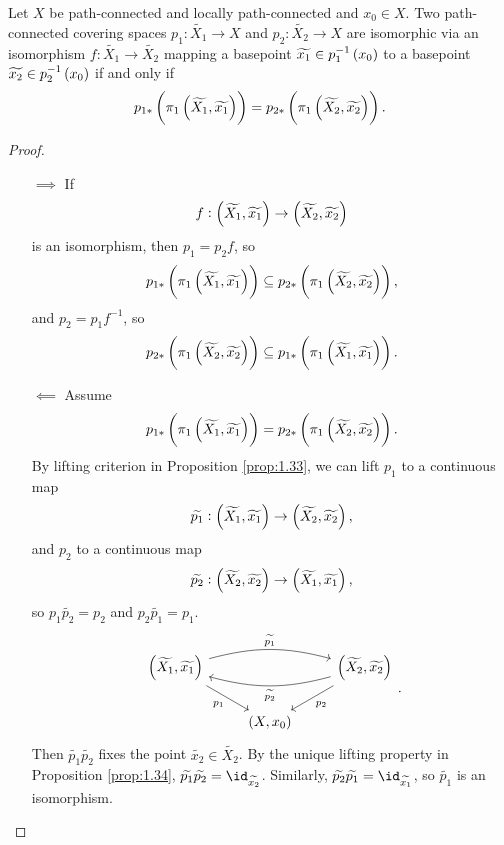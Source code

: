 \begin{proposition}
\label{prop:1.37}
Let $ X $ be path-connected and locally path-connected and $ x_0 \in X $. Two path-connected covering spaces $ p_1 : \widetilde{X_1} \to X $ and $ p_2 : \widetilde{X_2} \to X $ are isomorphic via an isomorphism $ f : \widetilde{X_1} \to \widetilde{X_2} $ mapping a basepoint $ \widetilde{x_1} \in p_1^{-1}\br{x_0} $ to a basepoint $ \widetilde{x_2} \in p_2^{-1}\br{x_0} $ if and only if
$$ p_{1*}\br{\pi_1\br{\widetilde{X_1}, \widetilde{x_1}}} = p_{2*}\br{\pi_1\br{\widetilde{X_2}, \widetilde{x_2}}}. $$
\end{proposition}

\begin{proof}
\hfill
\begin{itemize}
\item[$ \implies $] If
$$ f : \br{\widetilde{X_1}, \widetilde{x_1}} \to \br{\widetilde{X_2}, \widetilde{x_2}} $$
is an isomorphism, then $ p_1 = p_2f $, so
$$ p_{1*}\br{\pi_1\br{\widetilde{X_1}, \widetilde{x_1}}} \subseteq p_{2*}\br{\pi_1\br{\widetilde{X_2}, \widetilde{x_2}}}, $$
and $ p_2 = p_1f^{-1} $, so
$$ p_{2*}\br{\pi_1\br{\widetilde{X_2}, \widetilde{x_2}}} \subseteq p_{1*}\br{\pi_1\br{\widetilde{X_1}, \widetilde{x_1}}}. $$

\pagebreak

\item[$ \impliedby $] Assume
$$ p_{1*}\br{\pi_1\br{\widetilde{X_1}, \widetilde{x_1}}} = p_{2*}\br{\pi_1\br{\widetilde{X_2}, \widetilde{x_2}}}. $$
By lifting criterion in Proposition \ref{prop:1.33}, we can lift $ p_1 $ to a continuous map
$$ \widetilde{p_1} : \br{\widetilde{X_1}, \widetilde{x_1}} \to \br{\widetilde{X_2}, \widetilde{x_2}}, $$
and $ p_2 $ to a continuous map
$$ \widetilde{p_2} : \br{\widetilde{X_2}, \widetilde{x_2}} \to \br{\widetilde{X_1}, \widetilde{x_1}}, $$
so $ p_1\widetilde{p_2} = p_2 $ and $ p_2\widetilde{p_1} = p_1 $.
$$
\begin{tikzcd}
\br{\widetilde{X_1}, \widetilde{x_1}} \arrow[bend left=15]{rr}{\widetilde{p_1}} \arrow{dr}[swap]{p_1} & & \br{\widetilde{X_2}, \widetilde{x_2}} \arrow{dl}{p_2} \arrow[bend left=15]{ll}{\widetilde{p_2}} \\
& \br{X, x_0} &
\end{tikzcd}.
$$
Then $ \widetilde{p_1}\widetilde{p_2} $ fixes the point $ \widetilde{x_2} \in \widetilde{X_2} $. By the unique lifting property in Proposition \ref{prop:1.34}, $ \widetilde{p_1}\widetilde{p_2} = \id_{\widetilde{x_2}} $. Similarly, $ \widetilde{p_2}\widetilde{p_1} = \id_{\widetilde{x_1}} $, so $ \widetilde{p_1} $ is an isomorphism.
\end{itemize}
\end{proof}

